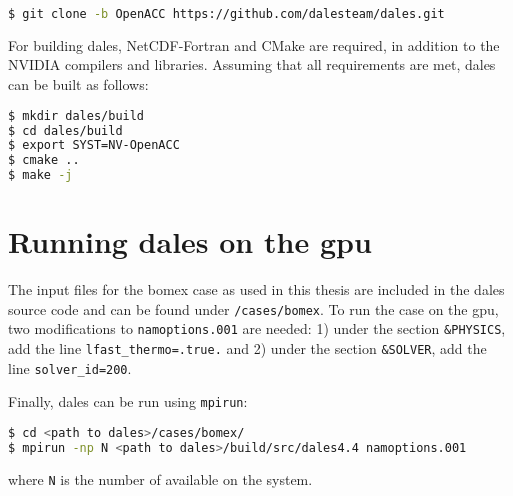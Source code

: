 \begin{lstlisting}[language=bash, numbers=none]
$ git clone -b OpenACC https://github.com/dalesteam/dales.git
\end{lstlisting}

For building \acrshort{dales}, NetCDF-Fortran and CMake are required, in addition to the NVIDIA compilers and libraries. Assuming that all requirements are met, \acrshort{dales} can be built as follows:

\begin{lstlisting}[language=bash, numbers=none]
$ mkdir dales/build
$ cd dales/build
$ export SYST=NV-OpenACC
$ cmake ..
$ make -j
\end{lstlisting}

\section{Running \acrshort{dales} on the \acrshort{gpu}}
The input files for the \acrshort{bomex} case as used in this thesis are included in the \acrshort{dales} source code and can be found under \texttt{/cases/bomex}. To run the case on the \acrshort{gpu}, two modifications to \texttt{namoptions.001} are needed: 1) under the section \texttt{\&PHYSICS}, add the line \texttt{lfast\_thermo=.true.} and 2) under the section \texttt{\&SOLVER}, add the line \texttt{solver\_id=200}.

Finally, \acrshort{dales} can be run using \texttt{mpirun}:

\begin{lstlisting}[language=bash, numbers=none]
$ cd <path to dales>/cases/bomex/
$ mpirun -np N <path to dales>/build/src/dales4.4 namoptions.001
\end{lstlisting}

where \texttt{N} is the number of  available on the system.